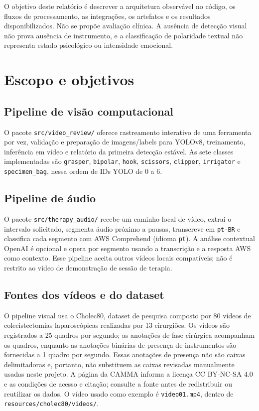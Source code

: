 \documentclass[12pt,a4paper]{article}
\begin{document}
O objetivo deste relatório é descrever a arquitetura observável no código, os fluxos de processamento, as integrações, os artefatos e os resultados disponibilizados. Não se propõe avaliação clínica. A ausência de detecção visual não prova ausência de instrumento, e a classificação de polaridade textual não representa estado psicológico ou intensidade emocional.

\section{Escopo e objetivos}

\subsection{Pipeline de visão computacional}

O pacote \texttt{src/video\_review/} oferece rastreamento interativo de uma ferramenta por vez, validação e preparação de imagens/labels para YOLOv8, treinamento, inferência em vídeo e relatório da primeira detecção estável. As sete classes implementadas são \texttt{grasper}, \texttt{bipolar}, \texttt{hook}, \texttt{scissors}, \texttt{clipper}, \texttt{irrigator} e \texttt{specimen\_bag}, nessa ordem de IDs YOLO de 0 a 6.

\subsection{Pipeline de áudio}

O pacote \texttt{src/therapy\_audio/} recebe um caminho local de vídeo, extrai o intervalo solicitado, segmenta áudio próximo a pausas, transcreve em \texttt{pt-BR} e classifica cada segmento com AWS Comprehend (idioma \texttt{pt}). A análise contextual OpenAI é opcional e opera por segmento usando a transcrição e a resposta AWS como contexto. Esse pipeline aceita outros vídeos locais compatíveis; não é restrito ao vídeo de demonstração de sessão de terapia.

\subsection{Fontes dos vídeos e do dataset}

O pipeline visual usa o Cholec80, dataset de pesquisa composto por 80 vídeos de colecistectomias laparoscópicas realizadas por 13 cirurgiões. Os vídeos são registrados a 25 quadros por segundo; as anotações de fase cirúrgica acompanham os quadros, enquanto as anotações binárias de presença de instrumentos são fornecidas a 1 quadro por segundo. Essas anotações de presença não são caixas delimitadoras e, portanto, não substituem as caixas revisadas manualmente usadas neste projeto. A página da CAMMA informa a licença CC BY-NC-SA 4.0 e as condições de acesso e citação; consulte a fonte antes de redistribuir ou reutilizar os dados. O vídeo usado como exemplo é \texttt{video01.mp4}, dentro de \texttt{resources/cholec80/videos/}.
\end{document}
